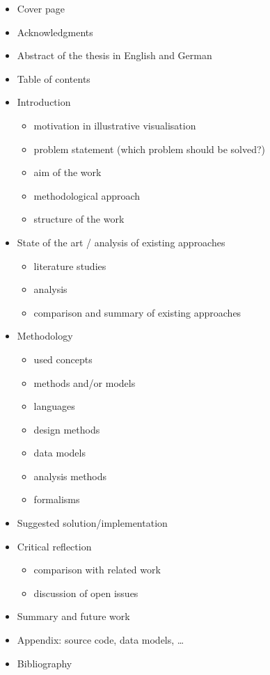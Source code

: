\begin{itemize}
  \item	Cover page
  \item Acknowledgments
  \item Abstract of the thesis in English and German
  \item Table of contents
  \item Introduction
  	\begin{itemize}
  		\item motivation
  		in illustrative visualisation 
  		\item problem statement (which problem should be solved?)
  		\item aim of the work
  		\item methodological approach
  		\item structure of the work
  	\end{itemize}
  \item State of the art / analysis of existing approaches
  	\begin{itemize}
  		\item literature studies
  		\item analysis
  		\item comparison and summary of existing approaches
  	\end{itemize}
  \item Methodology
  	\begin{itemize}
  		\item used concepts
  		\item methods and/or models
  		\item languages
  		\item design methods
  		\item data models
  		\item analysis methods
  		\item formalisms
  	\end{itemize}
  \item Suggested solution/implementation
  \item Critical reflection
  	\begin{itemize}
  		\item comparison with related work
  		\item discussion of open issues
  	\end{itemize}
  \item Summary and future work
  \item Appendix: source code, data models, \dots
  \item Bibliography
\end{itemize}

